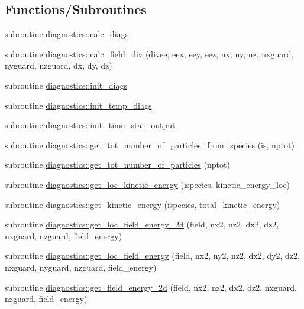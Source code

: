 \subsection*{Functions/\+Subroutines}
\begin{DoxyCompactItemize}
\item 
subroutine \hyperlink{namespacediagnostics_ae7171376e1d30d3465491f0f75a39180}{diagnostics\+::calc\+\_\+diags}
\item 
subroutine \hyperlink{namespacediagnostics_a28ade3a7daafd373b08dd7742315ed98}{diagnostics\+::calc\+\_\+field\+\_\+div} (divee, eex, eey, eez, nx, ny, nz, nxguard, nyguard, nzguard, dx, dy, dz)
\item 
subroutine \hyperlink{namespacediagnostics_a090bf3606a7c0c889195bd01b10adc5c}{diagnostics\+::init\+\_\+diags}
\item 
subroutine \hyperlink{namespacediagnostics_a111912cfff0906f9e78449119c1a3e43}{diagnostics\+::init\+\_\+temp\+\_\+diags}
\item 
subroutine \hyperlink{namespacediagnostics_a3ccd1d3efa537c9c73cbca0141184c32}{diagnostics\+::init\+\_\+time\+\_\+stat\+\_\+output}
\item 
subroutine \hyperlink{namespacediagnostics_a00e54b5beba626e955d8e3e946962f1d}{diagnostics\+::get\+\_\+tot\+\_\+number\+\_\+of\+\_\+particles\+\_\+from\+\_\+species} (is, nptot)
\item 
subroutine \hyperlink{namespacediagnostics_ab628191e427157162f167691267d0d1f}{diagnostics\+::get\+\_\+tot\+\_\+number\+\_\+of\+\_\+particles} (nptot)
\item 
subroutine \hyperlink{namespacediagnostics_addf30cc7cc0a935993be10cbf8b017f5}{diagnostics\+::get\+\_\+loc\+\_\+kinetic\+\_\+energy} (ispecies, kinetic\+\_\+energy\+\_\+loc)
\item 
subroutine \hyperlink{namespacediagnostics_ab51517b8d0751b8e43e0ab3c9338af41}{diagnostics\+::get\+\_\+kinetic\+\_\+energy} (ispecies, total\+\_\+kinetic\+\_\+energy)
\item 
subroutine \hyperlink{namespacediagnostics_a26be0942bfb3d70876815b6e121dec1c}{diagnostics\+::get\+\_\+loc\+\_\+field\+\_\+energy\+\_\+2d} (field, nx2, nz2, dx2, dz2, nxguard, nzguard, field\+\_\+energy)
\item 
subroutine \hyperlink{namespacediagnostics_a00b7e2217883d1cfe260ccc24e740663}{diagnostics\+::get\+\_\+loc\+\_\+field\+\_\+energy} (field, nx2, ny2, nz2, dx2, dy2, dz2, nxguard, nyguard, nzguard, field\+\_\+energy)
\item 
subroutine \hyperlink{namespacediagnostics_a35743d1121d2d5381a758ad94085362e}{diagnostics\+::get\+\_\+field\+\_\+energy\+\_\+2d} (field, nx2, nz2, dx2, dz2, nxguard, nzguard, field\+\_\+energy)

\end{DoxyCompactItemize}
